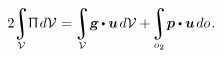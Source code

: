 \nopagebreak\vspace{-0.1em}\begin{equation}\label{clapeyron:elasticitytheorem}
2 \hspace{-0.2em}
\integral\displaylimits_{\mathcal{V}} \hspace{-0.5ex} \potentialenergydensity \hspace{.2ex} d\mathcal{V} \hspace{.12ex}
= \hspace{-0.2ex}
\integral\displaylimits_{\mathcal{V}} \hspace{-0.4ex} \volumeloadvector \hspace{-0.1ex} \dotp \bm{u} \hspace{.25ex} d\mathcal{V}
+ \hspace{-0.3ex}
\integral\displaylimits_{o_2} \hspace{-0.4ex} \bm{p} \dotp \bm{u} \hspace{.25ex} do
\hspace{.2ex} .
\end{equation}

